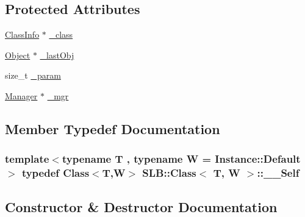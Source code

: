 \subsection*{Protected Attributes}
\begin{DoxyCompactItemize}
\item 
\hyperlink{classSLB_1_1ClassInfo}{Class\+Info} $\ast$ \hyperlink{classSLB_1_1Class_a5ae85558a02bdbc796fc8ebf7a9cca2b}{\+\_\+class}
\item 
\hyperlink{classSLB_1_1Object}{Object} $\ast$ \hyperlink{classSLB_1_1Class_adbba74b40f432641cffacd452b1b13de}{\+\_\+last\+Obj}
\item 
size\+\_\+t \hyperlink{classSLB_1_1Class_a4c8587ec0639601fd49f15d65eba2a63}{\+\_\+param}
\item 
\hyperlink{classSLB_1_1Manager}{Manager} $\ast$ \hyperlink{classSLB_1_1Class_a96cb9cefa58fc5b76221d227b74151e2}{\+\_\+mgr}
\end{DoxyCompactItemize}


\subsection{Member Typedef Documentation}
\subsubsection[{\texorpdfstring{\+\_\+\+\_\+\+Self}{__Self}}]{\setlength{\rightskip}{0pt plus 5cm}template$<$typename T , typename W  = Instance\+::\+Default$>$ typedef {\bf Class}$<$T,W$>$ {\bf S\+L\+B\+::\+Class}$<$ T, W $>$\+::{\bf \+\_\+\+\_\+\+Self}}\hypertarget{classSLB_1_1Class_aef6fc94f5e50c96268e669ab6946ad8b}{}\label{classSLB_1_1Class_aef6fc94f5e50c96268e669ab6946ad8b}


\subsection{Constructor \& Destructor Documentation}
